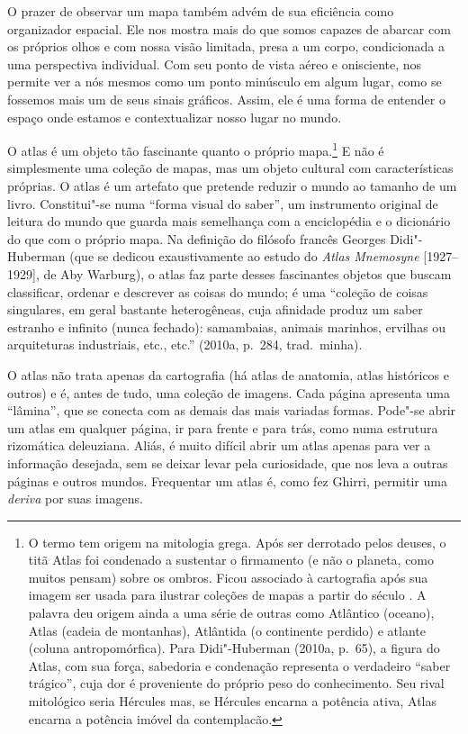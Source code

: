 O prazer de observar um mapa também advém de sua eficiência como
organizador espacial. Ele nos mostra mais do que somos capazes de
abarcar com os próprios olhos e com nossa visão limitada, presa a um
corpo, condicionada a uma perspectiva individual. Com seu ponto de vista
aéreo e onisciente, nos permite ver a nós mesmos como um ponto minúsculo
em algum lugar, como se fossemos mais um de seus sinais gráficos. Assim,
ele é uma forma de entender o espaço onde estamos e contextualizar nosso
lugar no mundo.

O atlas é um objeto tão fascinante quanto o próprio mapa.\footnote{O
  termo tem origem na mitologia grega. Após ser derrotado pelos deuses,
  o titã Atlas foi condenado a sustentar o firmamento (e não o planeta,
  como muitos pensam) sobre os ombros. Ficou associado à cartografia
  após sua imagem ser usada para ilustrar coleções de mapas a partir do
  século . A palavra deu origem ainda a uma série de outras como
  Atlântico (oceano), Atlas (cadeia de montanhas), Atlântida (o continente
  perdido) e atlante (coluna antropomórfica). Para Didi"-Huberman (2010a,
  p.~65), a figura do Atlas, com sua força, sabedoria e condenação
  representa o verdadeiro ``saber trágico'', cuja dor é proveniente do
  próprio peso do conhecimento. Seu rival mitológico seria Hércules mas,
  se Hércules encarna a potência ativa, Atlas encarna a potência imóvel
  da contemplacão.} E não é simplesmente uma coleção de mapas, mas um
objeto cultural com características próprias. O atlas é um artefato que
pretende reduzir o mundo ao tamanho de um livro. Constitui"-se numa
``forma visual do saber'', um instrumento original de leitura do mundo
que guarda mais semelhança com a enciclopédia e o dicionário do que com
o próprio mapa. Na definição do filósofo francês Georges Didi"-Huberman
(que se dedicou exaustivamente ao estudo do \emph{Atlas Mnemosyne}
{[}1927--1929{]}, de Aby Warburg), o atlas faz parte desses fascinantes
objetos que buscam classificar, ordenar e descrever as coisas do mundo;
é uma ``coleção de coisas singulares, em geral bastante heterogêneas,
cuja afinidade produz um saber estranho e infinito (nunca fechado):
samambaias, animais marinhos, ervilhas ou arquiteturas industriais,
etc., etc.'' (2010a, p.~284, trad.~minha).

O atlas não trata apenas da cartografia (há atlas de anatomia, atlas
históricos e outros) e é, antes de tudo, uma coleção de imagens. Cada
página apresenta uma ``lâmina'', que se conecta com as demais das mais
variadas formas. Pode"-se abrir um atlas em qualquer página, ir para
frente e para trás, como numa estrutura rizomática deleuziana. Aliás, é
muito difícil abrir um atlas apenas para ver a informação desejada, sem
se deixar levar pela curiosidade, que nos leva a outras páginas e outros
mundos. Frequentar um atlas é, como fez Ghirri, permitir uma
\emph{deriva} por suas imagens.

